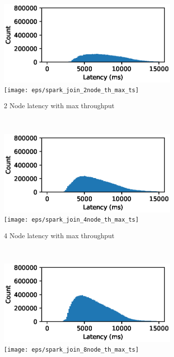 \begin{figure}
    \centering
   \begin{subfigure}[b]{0.3\textwidth}
       \includegraphics[width=\textwidth]{eps/spark_join_2node_th_max_hist}
        \texttt{[image: eps/spark\_join\_2node\_th\_max\_ts]}

       \caption{2 Node latency with max throughput}
   \end{subfigure}
   ~ 
   \begin{subfigure}[b]{0.3\textwidth}
       \includegraphics[width=\textwidth]{eps/spark_join_4node_th_max_hist}
        \texttt{[image: eps/spark\_join\_4node\_th\_max\_ts]}

       \caption{4 Node latency with max throughput }
   \end{subfigure}
   ~ 
   \begin{subfigure}[b]{0.3\textwidth}
       \includegraphics[width=\textwidth]{eps/spark_join_8node_th_max_hist}
        \texttt{[image: eps/spark\_join\_8node\_th\_max\_ts]}


\end{subfigure}
\end{figure}
